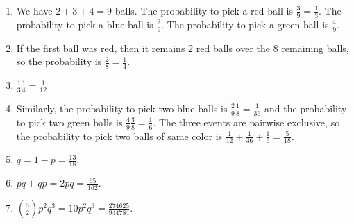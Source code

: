\begin{enumerate}
\item We have $2+3+4=9$ balls. The probability to pick a red ball is
  $\frac{3}{9} = \frac{1}{3}$. The probability to pick a blue ball is
  $\frac{2}{9}$. The probability to pick a green ball is
  $\frac{4}{9}$.
\item If the first ball was red, then it remains $2$ red balls over the $8$
  remaining balls, so the probability is $\frac{2}{8}=\frac{1}{4}$.
\item $\frac{1}{3} \frac{1}{4} = \frac{1}{12}$
\item Similarly, the probability to pick two blue balls is
  $\frac{2}{9} \frac{1}{8} = \frac{1}{36}$ and
  the probability to pick two green balls is
  $\frac{4}{9} \frac{3}{8} = \frac{1}{6}$. The three events are pairwise
  exclusive, so the probability to pick two balls of same color
  is $\frac{1}{12} + \frac{1}{36} + \frac{1}{6} = \frac{5}{18}$.
\item $q = 1 - p = \frac{13}{18}$.
\item $pq + qp = 2pq = \frac{65}{162}$.
\item $\binom{5}{2} p^2 q^3 = 10p^2q^3 = \frac{274625}{944784}$.
\end{enumerate}
